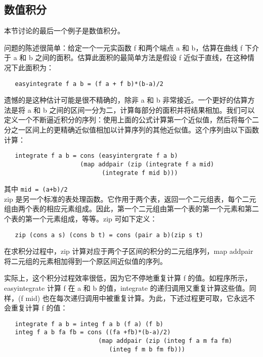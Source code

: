 \documentclass[12pt,a4paper]{article}
\begin{document}
\subsection{数值积分}

本节讨论的最后一个例子是数值积分。

问题的陈述很简单：给定一个一元实函数 f 和两个端点 a 和 b，估算在曲线 f 下介于 a 和 b 之间的面积。估算此面积的最简单方法是假设 f 近似于直线，在这种情况下此面积为：

\begin{verbatim}
   easyintegrate f a b = (f a + f b)*(b-a)/2
\end{verbatim}

遗憾的是这种估计可能是很不精确的，除非 a 和 b 非常接近。一个更好的估算方法是将 a 和 b 之间的区间一分为二，计算每部分的面积并将结果相加。我们可以定义一个不断逼近积分的序列：使用上面的公式计算第一个近似值，然后将每个二分之一区间上的更精确近似值相加以计算序列的其他近似值。这个序列由以下函数计算：

\begin{verbatim}
   integrate f a b = cons (easyintergrate f a b)
                     (map addpair (zip (integrate f a mid)
                           (integrate f mid b)))
\end{verbatim}

其中 \verb"mid = (a+b)/2"\\

zip 是另一个标准的表处理函数。它作用于两个表，返回一个二元组表，每个二元组由两个表的相应元素组成。因此，第一个二元组由第一个表的第一个元素和第二个表的第一个元素组成，等等。zip 可如下定义：

\begin{verbatim}
   zip (cons a s) (cons b t) = cons (pair a b)(zip s t)
\end{verbatim}

在求积分过程中，zip 计算对应于两个子区间的积分的二元组序列，map addpair 将二元组的元素相加得到一个原区间近似值的序列。

实际上，这个积分过程效率很低，因为它不停地重复计算 f 的值。如程序所示，easyintegrate 计算 f 在 a 和 b 的值，integrate 的递归调用又重复计算这些值。同样，(f mid) 也在每次递归调用中被重复计算。为此，下述过程更可取，它永远不会重复计算 f 的值：

\begin{verbatim}
   integrate f a b = integ f a b (f a) (f b)
   integ f a b fa fb = cons ((fa +fb)*(b-a)/2)
                          (map addpair (zip (integ f a m fa fm)
                             (integ f m b fm fb)))
\end{verbatim}
   
\end{document}
